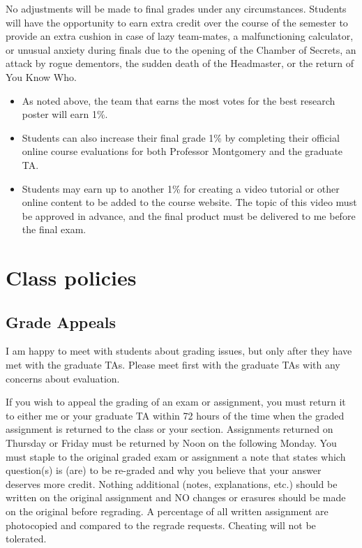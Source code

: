 \documentclass[11pt]{article}
\begin{document}
No adjustments will be made to final grades under any circumstances.
Students will have the opportunity to earn extra credit over the
course of the semester to provide an extra cushion in case of lazy
team-mates, a malfunctioning calculator, or unusual anxiety during
finals due to the opening of the Chamber of Secrets, an attack by
rogue dementors, the sudden death of the Headmaster, or the return of
You Know Who.

\begin{itemize}
\item As noted above, the team that earns the most votes for the best research poster will earn 1\%.  
\item Students can also increase their final grade 1\% by completing their
official online course evaluations for both Professor Montgomery and
the graduate TA.  
\item Students may earn up to another 1\% for creating a
video tutorial or other online content to be added to the course
website. The topic of this video must be approved in advance, and the
final product must be delivered to me before the final exam. 
\end{itemize}
\section*{Class policies}

\subsection*{Grade Appeals}

I am happy to meet with students about grading issues, but only after
they have met with the graduate TAs. Please meet first
with the graduate TAs with any concerns about evaluation.

If you wish to appeal the grading of an exam or assignment, you must
return it to either me or your graduate TA within 72 hours of the time when the graded assignment is returned to
the class or your section. Assignments returned on Thursday or Friday
must be returned by Noon on the following Monday.  You must staple to
the original graded exam or assignment a note that states which
question(s) is (are) to be re-graded and why you believe that your
answer deserves more credit. Nothing additional (notes, explanations,
etc.) should be written on the original assignment and NO changes or
erasures should be made on the original before regrading.  A
percentage of all written assignment are photocopied and compared to
the regrade requests. Cheating will not be tolerated.
\end{document}
